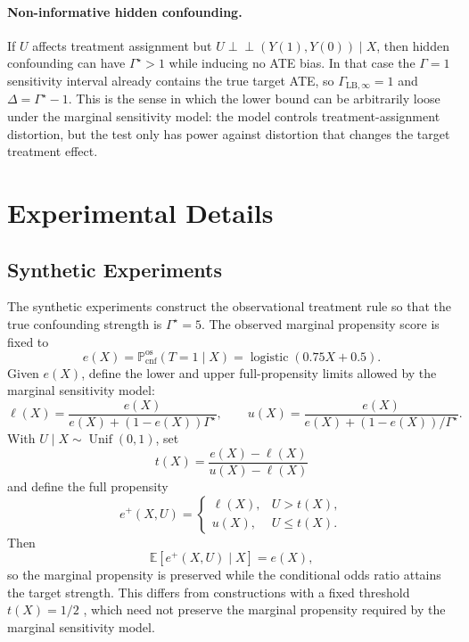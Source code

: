\paragraph{Non-informative hidden confounding.}
If \(U\) affects treatment assignment but \(U\perp\!\!\!\perp (Y(1),Y(0))\mid X\), then hidden confounding can have \(\Gamma^\star>1\) while inducing no ATE bias. In that case the \(\Gamma=1\) sensitivity interval already contains the true target ATE, so \(\Gamma_{\mathrm{LB},\infty}=1\) and \(\Delta=\Gamma^\star-1\). This is the sense in which the lower bound can be arbitrarily loose under the marginal sensitivity model: the model controls treatment-assignment distortion, but the test only has power against distortion that changes the target treatment effect.

\section{Experimental Details}
\label{app:confounding-experimental-details}

\subsection{Synthetic Experiments}
\label{app:confounding-synthetic-details}

The synthetic experiments construct the observational treatment rule so that the true confounding strength is \(\Gamma^\star=5\). The observed marginal propensity score is fixed to
\[
  e(X)
  =
  \mathbb{P}^{\mathrm{os}}_{\mathrm{cnf}}(T=1\mid X)
  =
  \operatorname{logistic}(0.75X+0.5).
\]
Given \(e(X)\), define the lower and upper full-propensity limits allowed by the marginal sensitivity model:
\[
  \ell(X)
  =
  \frac{e(X)}{e(X)+(1-e(X))\Gamma^\star},
  \qquad
  u(X)
  =
  \frac{e(X)}{e(X)+(1-e(X))/\Gamma^\star}.
\]
With \(U\mid X\sim\operatorname{Unif}(0,1)\), set
\[
  t(X)
  =
  \frac{e(X)-\ell(X)}{u(X)-\ell(X)}
\]
and define the full propensity
\[
  e^+(X,U)
  =
  \begin{cases}
    \ell(X), & U>t(X), \\
    u(X), & U\leq t(X).
  \end{cases}
\]
Then
\[
  \mathbb{E}[e^+(X,U)\mid X]
  =
  e(X),
\]
so the marginal propensity is preserved while the conditional odds ratio attains the target strength. This differs from constructions with a fixed threshold \(t(X)=1/2\) \citep{kallus2019interval,jesson2021quantifying,oprescu2023b}, which need not preserve the marginal propensity required by the marginal sensitivity model.

